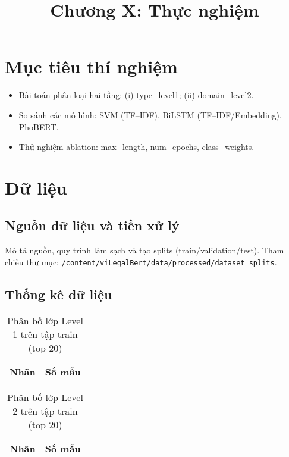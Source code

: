 \documentclass[12pt,a4paper]{article}
\title{Chương X: Thực nghiệm}\date{}
\begin{document}
\maketitle

\section{Mục tiêu thí nghiệm}
\begin{itemize}
  \item Bài toán phân loại hai tầng: (i) type\_level1; (ii) domain\_level2.
  \item So sánh các mô hình: SVM (TF--IDF), BiLSTM (TF--IDF/Embedding), PhoBERT.
  \item Thử nghiệm ablation: max\_length, num\_epochs, class\_weights.
\end{itemize}

\section{Dữ liệu}
\subsection{Nguồn dữ liệu và tiền xử lý}
Mô tả nguồn, quy trình làm sạch và tạo splits (train/validation/test). Tham chiếu thư mục: \texttt{/content/viLegalBert/data/processed/dataset\_splits}.

\subsection{Thống kê dữ liệu}
\begin{table}[H]
  \centering
  \caption{Phân bố lớp Level 1 trên tập train (top 20)}
  \begin{tabular}{ll}
    \toprule
    Nhãn & Số mẫu \\
    \midrule
    \bottomrule
  \end{tabular}
\end{table}

\begin{table}[H]
  \centering
  \caption{Phân bố lớp Level 2 trên tập train (top 20)}
  \begin{tabular}{ll}
    \toprule
    Nhãn & Số mẫu \\
    \midrule
    \bottomrule
  \end{tabular}
\end{table}
\end{document}

